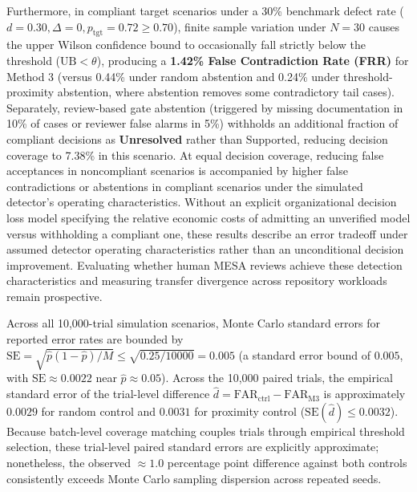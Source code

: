\documentclass[runningheads]{llncs}
\begin{document}
Furthermore, in compliant target scenarios under a 30\% benchmark defect rate ($d = 0.30, \Delta = 0, p_{\text{tgt}} = 0.72 \ge 0.70$), finite sample variation under $N = 30$ causes the upper Wilson confidence bound to occasionally fall strictly below the threshold ($\text{UB} < \theta$), producing a \textbf{1.42\% False Contradiction Rate (FRR)} for Method 3 (versus 0.44\% under random abstention and 0.24\% under threshold-proximity abstention, where abstention removes some contradictory tail cases). Separately, review-based gate abstention (triggered by missing documentation in 10\% of cases or reviewer false alarms in 5\%) withholds an additional fraction of compliant decisions as \textbf{Unresolved} rather than Supported, reducing decision coverage to 7.38\% in this scenario. At equal decision coverage, reducing false acceptances in noncompliant scenarios is accompanied by higher false contradictions or abstentions in compliant scenarios under the simulated detector's operating characteristics. Without an explicit organizational decision loss model specifying the relative economic costs of admitting an unverified model versus withholding a compliant one, these results describe an error tradeoff under assumed detector operating characteristics rather than an unconditional decision improvement. Evaluating whether human MESA reviews achieve these detection characteristics and measuring transfer divergence across repository workloads remain prospective.

Across all 10,000-trial simulation scenarios, Monte Carlo standard errors for reported error rates are bounded by $\text{SE} = \sqrt{\hat{p}(1-\hat{p})/M} \le \sqrt{0.25/10000} = 0.005$ (a standard error bound of $0.005$, with $\text{SE} \approx 0.0022$ near $\hat{p} \approx 0.05$). Across the 10,000 paired trials, the empirical standard error of the trial-level difference $\hat{d} = \text{FAR}_{\text{ctrl}} - \text{FAR}_{\text{M3}}$ is approximately $0.0029$ for random control and $0.0031$ for proximity control ($\text{SE}(\hat{d}) \le 0.0032$). Because batch-level coverage matching couples trials through empirical threshold selection, these trial-level paired standard errors are explicitly approximate; nonetheless, the observed $\approx 1.0$ percentage point difference against both controls consistently exceeds Monte Carlo sampling dispersion across repeated seeds.
\end{document}
